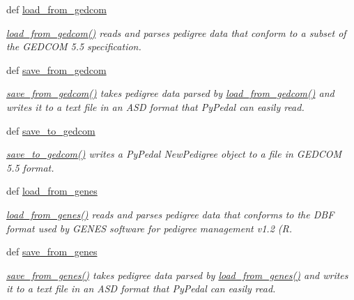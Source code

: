 \begin{CompactItemize}
def \hyperlink{namespacePyPedal_1_1pyp__io_94c9bc92f204b70cb8bedd3b81b9a5bb}{load\_\-from\_\-gedcom}
\begin{CompactList}\small\item\em \hyperlink{namespacePyPedal_1_1pyp__io_94c9bc92f204b70cb8bedd3b81b9a5bb}{load\_\-from\_\-gedcom()} reads and parses pedigree data that conform to a subset of the GEDCOM 5.5 specification. \item\end{CompactList}\item 
def \hyperlink{namespacePyPedal_1_1pyp__io_1f13533bd51ef47b9b12486ce509c0e3}{save\_\-from\_\-gedcom}
\begin{CompactList}\small\item\em \hyperlink{namespacePyPedal_1_1pyp__io_1f13533bd51ef47b9b12486ce509c0e3}{save\_\-from\_\-gedcom()} takes pedigree data parsed by \hyperlink{namespacePyPedal_1_1pyp__io_94c9bc92f204b70cb8bedd3b81b9a5bb}{load\_\-from\_\-gedcom()} and writes it to a text file in an ASD format that Py\-Pedal can easily read. \item\end{CompactList}\item 
def \hyperlink{namespacePyPedal_1_1pyp__io_aee7ce6d9337cee600d7c3f1cd8abbc1}{save\_\-to\_\-gedcom}
\begin{CompactList}\small\item\em \hyperlink{namespacePyPedal_1_1pyp__io_aee7ce6d9337cee600d7c3f1cd8abbc1}{save\_\-to\_\-gedcom()} writes a Py\-Pedal New\-Pedigree object to a file in GEDCOM 5.5 format. \item\end{CompactList}\item 
def \hyperlink{namespacePyPedal_1_1pyp__io_f8605ce996a153170ed565840990ed0c}{load\_\-from\_\-genes}
\begin{CompactList}\small\item\em \hyperlink{namespacePyPedal_1_1pyp__io_f8605ce996a153170ed565840990ed0c}{load\_\-from\_\-genes()} reads and parses pedigree data that conforms to the DBF format used by GENES software for pedigree management v1.2 (R. \item\end{CompactList}\item 
def \hyperlink{namespacePyPedal_1_1pyp__io_ad4bb26c9f774a572fb64300db6cdbfb}{save\_\-from\_\-genes}
\begin{CompactList}\small\item\em \hyperlink{namespacePyPedal_1_1pyp__io_ad4bb26c9f774a572fb64300db6cdbfb}{save\_\-from\_\-genes()} takes pedigree data parsed by \hyperlink{namespacePyPedal_1_1pyp__io_f8605ce996a153170ed565840990ed0c}{load\_\-from\_\-genes()} and writes it to a text file in an ASD format that Py\-Pedal can easily read. \item\end{CompactList}\item 

\end{CompactItemize}
